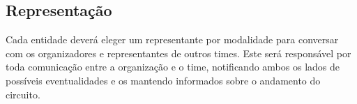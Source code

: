 \subsection{Representação}

Cada entidade deverá eleger um representante por modalidade para conversar com os organizadores e representantes de outros times. Este será responsável por toda comunicação entre a organização e o time, notificando ambos os lados de possíveis eventualidades e os mantendo informados sobre o andamento do circuito.
